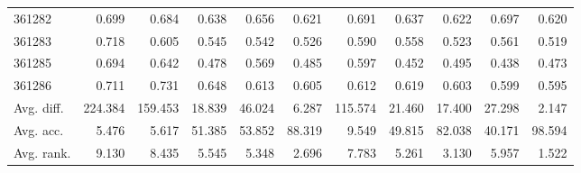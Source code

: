 \begin{tabular}{lrrrrrrrrrr}
361282 & 0.699 & 0.684 & 0.638 & 0.656 & 0.621 & 0.691 & 0.637 & 0.622 & 0.697 & 0.620 \\
361283 & 0.718 & 0.605 & 0.545 & 0.542 & 0.526 & 0.590 & 0.558 & 0.523 & 0.561 & 0.519 \\
361285 & 0.694 & 0.642 & 0.478 & 0.569 & 0.485 & 0.597 & 0.452 & 0.495 & 0.438 & 0.473 \\
361286 & 0.711 & 0.731 & 0.648 & 0.613 & 0.605 & 0.612 & 0.619 & 0.603 & 0.599 & 0.595 \\
Avg. diff. & 224.384 & 159.453 & 18.839 & 46.024 & 6.287 & 115.574 & 21.460 & 17.400 & 27.298 & 2.147 \\
Avg. acc. & 5.476 & 5.617 & 51.385 & 53.852 & 88.319 & 9.549 & 49.815 & 82.038 & 40.171 & 98.594 \\
Avg. rank. & 9.130 & 8.435 & 5.545 & 5.348 & 2.696 & 7.783 & 5.261 & 3.130 & 5.957 & 1.522 \\
\bottomrule
\end{tabular}
